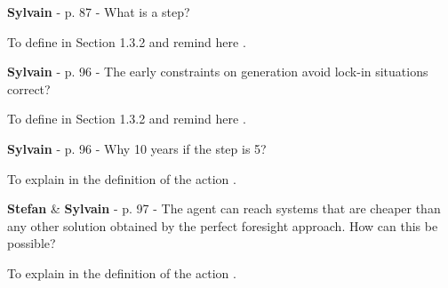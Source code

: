 \documentclass[12pt,a4paper]{article}
\begin{document}
\begin{mdframed}[style=comment] %
{\color{purple} \textbf{Sylvain}} - p. 87 - What is a step?
\end{mdframed}

\noindent To define in Section 1.3.2 and remind here {\color{blue} }. 

\begin{mdframed}[style=manuscript] %

\end{mdframed}

\begin{mdframed}[style=comment] %
{\color{purple} \textbf{Sylvain}} - p. 96 - The early constraints on generation avoid lock-in situations correct?
\end{mdframed}

\noindent To define in Section 1.3.2 and remind here {\color{blue} }. 

\begin{mdframed}[style=manuscript] %

\end{mdframed}

\begin{mdframed}[style=comment] %
{\color{purple} \textbf{Sylvain}} - p. 96 - Why 10 years if the step is 5?
\end{mdframed}

\noindent To explain in the definition of the action {\color{blue} }. 

\begin{mdframed}[style=manuscript] %

\end{mdframed}

\begin{mdframed}[style=comment] %
{\color{teal} \textbf{Stefan}} \& {\color{purple} \textbf{Sylvain}} - p. 97 - The agent can reach systems that are cheaper than any other solution obtained by the perfect foresight approach. How can this be possible?
\end{mdframed}

\noindent To explain in the definition of the action {\color{blue} }. 

\begin{mdframed}[style=manuscript] %

\end{mdframed}
\end{document}
